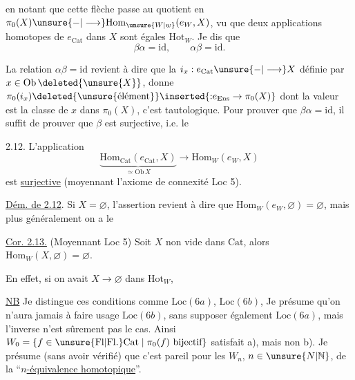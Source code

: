 en notant que cette flèche passe au quotient en $\pi_0(X)\unsure{-|\longrightarrow}\mathrm{Hom}_{\unsure{W|w}}(e_W,X)$, vu que deux applications homotopes de $e_{\mathrm{Cat}}$ dans $X$ sont égales  $\mathrm{Hot}_W$. Je dis que 
\[
\beta\alpha=\mathrm{id},\qquad\alpha\beta=\mathrm{id}.
\]

La relation $\alpha\beta=\mathrm{id}$ revient à dire que la  $i_x:e_{\mathrm{Cat}}\unsure{-|\longrightarrow}X$ définie par $x\in\mathrm{Ob}\,\deleted{\unsure{X}}$,  donne $\pi_0(i_x)\deleted{\unsure{\text{élément}}}\inserted{{:}e_{\mathrm{Ens}}\to\pi_0(X)}$  dont la valeur est la classe de $x$ dans $\pi_0(X)$, c'est tautologique. Pour prouver que $\beta\alpha=\mathrm{id}$, il suffit  de prouver que $\beta$ est surjective, i.e. le

\uline{} 2.12.  L'application
\[
\underbrace{\mathrm{Hom}_{\mathrm{Cat}}(e_{\mathrm{Cat}},X)}_{\simeq\mathrm{Ob}\,X}
\longrightarrow\mathrm{Hom}_W(e_W,X)
\]
est \uline{surjective}  (moyennant l'axiome de connexité Loc 5).


\uline{Dém. de 2.12}. Si $X=\varnothing$, l'assertion revient à dire que $\mathrm{Hom}_W(e_W,\varnothing)=\varnothing$,   mais plus généralement on a le

\uline{Cor. 2.13.} (Moyennant Loc 5) Soit $X$ non vide dans $\mathrm{Cat}$, alors $\mathrm{Hom}_W(X,\varnothing)=\varnothing$. 

En effet, si on avait $X\to\varnothing$ dans $\mathrm{Hot}_W$,


\uline{NB}  Je distingue ces conditions comme $\mathrm{Loc}(6a)$,  $\mathrm{Loc}(6b)$,  Je présume qu'on n'aura jamais à faire usage  $\mathrm{Loc}(6b)$, sans supposer également $\mathrm{Loc}(6a)$, mais l'inverse n'est sûrement pas le cas. Ainsi $W_0=\{f\in\unsure{\mathrm{Fl}|\mathrm{Fl.}}\mathrm{Cat}\mid\pi_0(f)\ \text{bijectif}\}$ satisfait a), mais non b). Je présume (sans avoir vérifié) que c'est pareil pour les $W_n$, $n\in\unsure{N|\mathbb N}$, de la ``\uline{$n$-équivalence homotopique}''.

